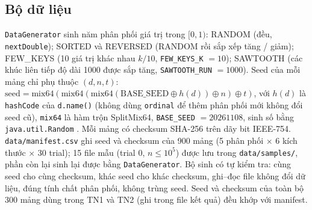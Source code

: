 \documentclass[11pt,a4paper]{article}
\begin{document}
\subsection{Bộ dữ liệu}
\texttt{DataGenerator} sinh năm phân phối giá trị trong $[0,1)$:
RANDOM (đều, \texttt{nextDouble}); SORTED và REVERSED (RANDOM rồi sắp xếp tăng / giảm);
FEW\_KEYS (10 giá trị khác nhau $k/10$, \texttt{FEW\_KEYS\_K} $=10$);
SAWTOOTH (các khúc liên tiếp độ dài 1000 được sắp tăng, \texttt{SAWTOOTH\_RUN} $=1000$).
Seed của mỗi mảng chỉ phụ thuộc $(d, n, t)$:
$\mathrm{seed} = \mathrm{mix64}(\mathrm{mix64}(\mathrm{mix64}(\mathrm{BASE\_SEED} \oplus h(d)) \oplus n) \oplus t)$,
với $h(d)$ là \texttt{hashCode} của \texttt{d.name()} (không dùng \texttt{ordinal} để thêm phân phối mới không đổi
seed cũ), \texttt{mix64} là hàm trộn SplitMix64, \texttt{BASE\_SEED} $=20261108$, sinh số bằng
\texttt{java.util.Random} \citep{javarandom}. Mỗi mảng có checksum SHA-256 trên dãy bit IEEE-754.
\texttt{data/manifest.csv} ghi seed và checksum của 900 mảng (5 phân phối $\times$ 6 kích thước $\times$ 30 trial);
15 file mẫu (trial 0, $n \le 10^5$) được lưu trong \texttt{data/samples/}, phần còn lại sinh lại được bằng
\texttt{DataGenerator}. Bộ sinh có tự kiểm tra: cùng seed cho cùng checksum, khác seed cho khác checksum,
ghi--đọc file không đổi dữ liệu, đúng tính chất phân phối, không trùng seed. Seed và checksum của toàn bộ
300 mảng dùng trong TN1 và TN2 (ghi trong file kết quả) đều khớp với manifest.
\end{document}
